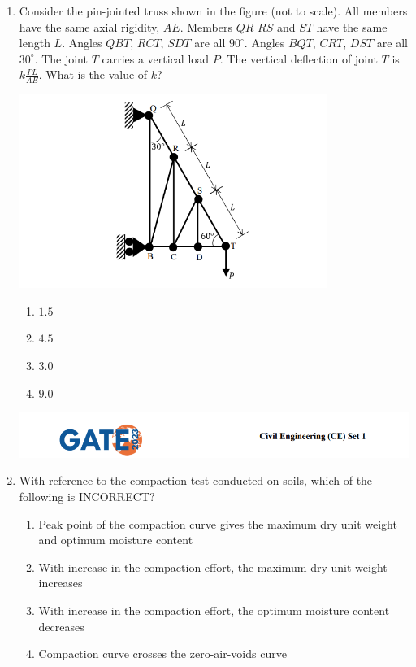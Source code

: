 \documentclass{exam}
\begin{document}
\begin{enumerate}
\item Consider the pin-jointed truss shown in the figure (not to scale). All members have the same axial rigidity, $AE$. Members $QR$
$RS$ and $ST$ have the same length $L$. Angles $QBT$, $RCT$, $SDT$ are all $90^\circ$. Angles $BQT$, $CRT$, $DST$ are all $30^\circ$. The joint $T$ carries a vertical load $P$. The vertical deflection of joint $T$ is $k\frac{PL}{AE}$. What is the value of $k$?
\begin{center}
    \includegraphics[width=10cm]{pics/Screenshot 2025-08-05 211110.png}
\end{center}
\begin{enumerate}
    \item $1.5$
    \item $4.5$
    \item $3.0$
    \item $9.0$
\end{enumerate}
\vspace{0.5cm}

\newpage

\includegraphics[width=\textwidth]{pics/header.png}
\item With reference to the compaction test conducted on soils, which of the following is INCORRECT?
\begin{enumerate}
    \item Peak point of the compaction curve gives the maximum dry unit weight and optimum moisture content
    \item With increase in the compaction effort, the maximum dry unit weight increases
    \item With increase in the compaction effort, the optimum moisture content decreases
    \item Compaction curve crosses the zero-air-voids curve
\end{enumerate}
\vspace{0.5cm}


\end{enumerate}
\end{document}
